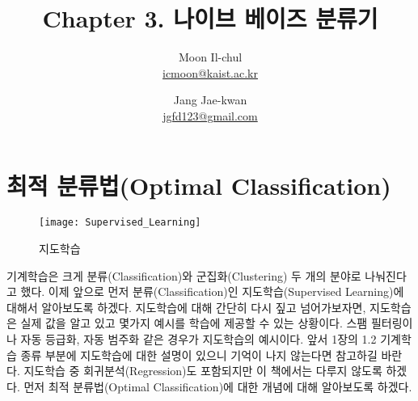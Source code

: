 \documentclass[a4paper]{oblivoir}
\author{Moon Il-chul \\ \href{mailto:icmoon@kaist.ac.kr}{icmoon@kaist.ac.kr} 
   \and Jang Jae-kwan \\ \href{mailto:jgfd123@gmail.com}{jgfd123@gmail.com} }
\title{Chapter 3. 나이브 베이즈 분류기}
\begin{document}
\maketitle
\tableofcontents

\section{최적 분류법(Optimal Classification)}
\begin{figure}[ht]\centering
\texttt{[image: Supervised\_Learning]}\caption{지도학습}\label{Fig:3-1}
\end{figure}
기계학습은 크게 분류(Classification)와 군집화(Clustering) 두 개의 분야로 나눠진다고 했다. 이제 앞으로 먼저 분류(Classification)인 지도학습(Supervised Learning)에 대해서 알아보도록 하겠다. 지도학습에 대해 간단히 다시 짚고 넘어가보자면, 지도학습은 실제 값을 알고 있고 몇가지 예시를 학습에 제공할 수 있는 상황이다. 스팸 필터링이나 자동 등급화, 자동 범주화 같은 경우가 지도학습의 예시이다. 앞서 1장의 1.2 기계학습 종류 부분에 지도학습에 대한 설명이 있으니 기억이 나지 않는다면 참고하길 바란다. 지도학습 중 회귀분석(Regression)도 포함되지만 이 책에서는 다루지 않도록 하겠다. 먼저 최적 분류법(Optimal Classification)에 대한 개념에 대해 알아보도록 하겠다.\\

\end{document}
